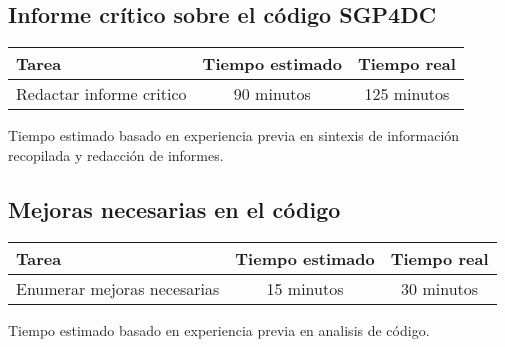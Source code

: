 \documentclass[12pt,a4paper]{article}
\begin{document}
\subsection{Informe crítico sobre el código SGP4DC}
    \begin{center}
        \begin{tabular}{|l|c|c|}
            \hline
            \textbf{Tarea} & \textbf{Tiempo estimado} & \textbf{Tiempo real} \\
            \hline
            Redactar informe critico & 90 minutos & 125 minutos \\
            \hline
        \end{tabular}
    \end{center}
    \begin{center}
        Tiempo estimado basado en experiencia previa en sintexis de información recopilada y redacción de informes.
    \end{center}

\subsection{Mejoras necesarias en el código}
    \begin{center}
        \begin{tabular}{|l|c|c|}
            \hline
            \textbf{Tarea} & \textbf{Tiempo estimado} & \textbf{Tiempo real} \\
            \hline
            Enumerar mejoras necesarias & 15 minutos & 30 minutos \\
            \hline
        \end{tabular}
    \end{center}
    \begin{center}
        Tiempo estimado basado en experiencia previa en analisis de código.
    \end{center}
\end{document}
